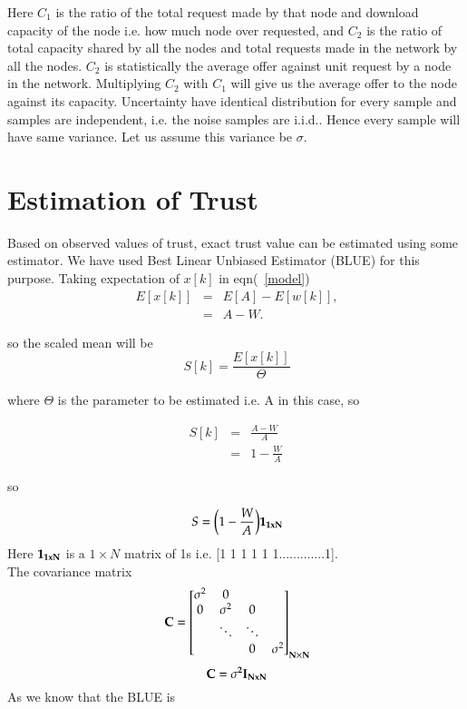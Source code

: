 \documentclass{IEEEtran}
\begin{document}
Here $C_{1}$ is the ratio of the total request made by that node and download capacity of the node i.e. how much node over requested, and $C_{2}$ is the ratio of total capacity shared by all the nodes  and total requests made in the network by all the nodes.
$C_{2}$ is statistically the average offer against unit request by a node
in the network. Multiplying $C_{2}$ with $C_{1}$ will give us the average
offer to the node against its capacity. Uncertainty have identical distribution for every sample and samples are independent, i.e. the noise samples are i.i.d.. Hence every sample will have same variance. Let us assume this variance be $\sigma$.

\section{Estimation of Trust}
Based on observed values of trust, exact trust value can be estimated using some
estimator. We have used Best Linear Unbiased Estimator (BLUE) \cite{blue} for
this purpose.
Taking expectation of $ x[k] $ in eqn(~\ref{model})
\begin{eqnarray}\
  E[x[k]] &= &E[A] - E[w[k]], \\
  \nonumber & =& A-W.
\end{eqnarray}

so the scaled mean will be
\begin{equation}\
  S[k]= \frac{E[x[k]]}{\Theta}
\end{equation}

where $\Theta$ is the parameter to be estimated i.e. A in this case, so

\begin{eqnarray}
   \nonumber S[k] &=& \frac {A-W}{A} \\
  &=& 1-\frac{W}{A}
\end{eqnarray}

so

\begin{equation}\
S = \biggl(1-\frac {W}{A}\biggl){\bf 1_{1xN}}
\end{equation}
Here ${\bf 1_{1xN}}$ is a $1\times N$ matrix of 1s i.e. [1 1 1 1 1 1.............1].\\
The covariance matrix
 \begin {equation}\
  \bf  C = \begin{bmatrix}

      \sigma^{2} & 0\\

      0 & \sigma^{2} & 0\\

      & \ddots & \ddots \\

      & & 0 & \sigma^{2}

\end{bmatrix}_{N\times N}
\end{equation}
\begin{equation}\
\bf {C} = \sigma^{2}\bf{I}_{NxN}
\end{equation}
As we know that the BLUE \cite{blue} is
\end{document}
